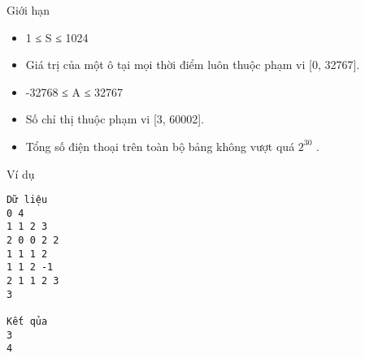 Giới hạn
\begin{itemize}
	\item 1 ≤ S ≤ 1024
	\item Giá trị của một ô tại mọi thời điểm luôn thuộc phạm vi [0, 32767].
	\item -32768 ≤ A ≤ 32767
	\item Số chỉ thị thuộc phạm vi [3, 60002].
	\item Tổng số điện thoại trên toàn bộ bảng không vượt quá $2^{30}$ .
\end{itemize}
Ví dụ
\begin{verbatim}
Dữ liệu
0 4  		
1 1 2 3  		
2 0 0 2 2
1 1 1 2
1 1 2 -1
2 1 1 2 3
3

Kết qủa
3
4
\end{verbatim}